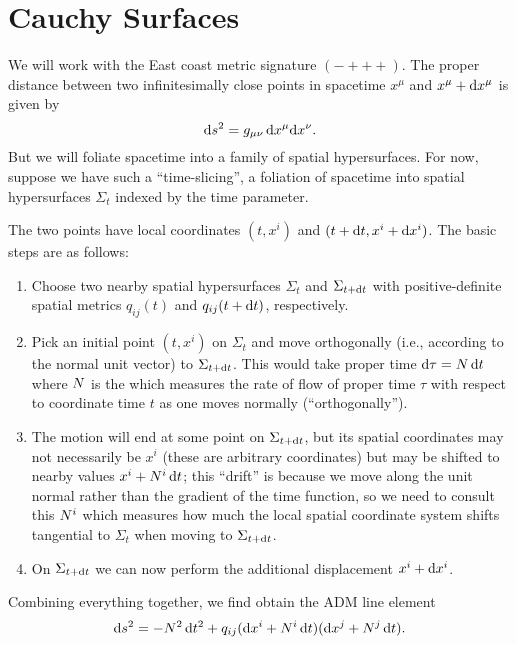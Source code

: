 \section{Cauchy Surfaces}

We will work with the East coast metric signature $(-+++)$. The proper
distance between two infinitesimally close points in spacetime $x^{\mu}$
and $x^{\mu} + \mathrm{d} x^{\mu}$ is given by
\begin{equation}
\mathrm{d} s^{2} = g_{\mu\nu}\,\mathrm{d} x^{\mu}\mathrm{d} x^{\nu}.
\end{equation}
But we will foliate spacetime into a family of spatial
hypersurfaces. For now, suppose we have such a ``time-slicing'', a
foliation of spacetime into spatial hypersurfaces $\Sigma_{t}$ indexed
by the time parameter.

The two points have local coordinates $(t,x^{i})$ and $(t+\mathrm{d} t, x^{i} + \mathrm{d} x^{i})$.
The basic steps are as follows:
\begin{enumerate}
\item Choose two nearby spatial hypersurfaces $\Sigma_{t}$ and
  $\Sigma_{t+\mathrm{d} t}$ with positive-definite spatial metrics $q_{ij}(t)$
  and $q_{ij}(t + \mathrm{d} t)$, respectively.
\item Pick an initial point $(t, x^{i})$ on $\Sigma_{t}$ and move
  orthogonally (i.e., according to the normal unit vector) to
  $\Sigma_{t+\mathrm{d} t}$. This would take proper time $\mathrm{d}\tau=N\,\mathrm{d} t$ where
  $N$ is the  which measures the rate of flow of
  proper time $\tau$ with respect to coordinate time $t$ as one moves
  normally (``orthogonally'').
\item The motion will end at some point on $\Sigma_{t + \mathrm{d} t}$, but its
  spatial coordinates may not necessarily be $x^{i}$ (these are
  arbitrary coordinates) but may be shifted to nearby values
  $x^{i}+N^{i}\,\mathrm{d} t$; this ``drift'' is because we move along the unit
  normal rather than the gradient of the time function, so we need to
  consult this  $N^{i}$ which measures how much the
  local spatial coordinate system shifts tangential to $\Sigma_{t}$ when
  moving to $\Sigma_{t + \mathrm{d} t}$.
\item On $\Sigma_{t+\mathrm{d} t}$ we can now perform the additional
  displacement $x^{i} + \mathrm{d} x^{i}$.
\end{enumerate}
Combining everything together, we find obtain the ADM line element
\begin{equation}
\mathrm{d} s^{2} = -N^{2}\,\mathrm{d} t^{2}
  + q_{ij}(\mathrm{d} x^{i} + N^{i}\,\mathrm{d} t)(\mathrm{d} x^{j} + N^{j}\,\mathrm{d} t).
\end{equation}
